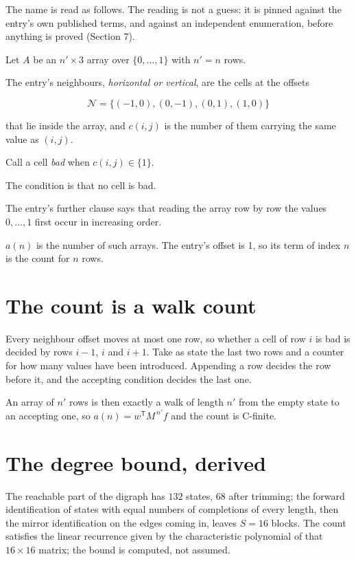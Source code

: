 \documentclass[11pt]{article}
\theoremstyle{definition}
\begin{document}
The name is read as follows. The reading is not a guess: it is pinned against the entry's own published terms, and against an independent enumeration, before anything is proved (Section 7).

Let $A$ be an $n' \times 3$ array over $\{0,\dots,1\}$ with $n' = n$ rows.

The entry's neighbours, {\itshape horizontal or vertical}, are the cells at the offsets

\[\mathcal{N} = \{(-1,0), (0,-1), (0,1), (1,0)\}\]

that lie inside the array, and $c(i,j)$ is the number of them carrying the same value as $(i,j)$.

Call a cell {\itshape bad} when $c(i,j) \in \{1\}$.

The condition is that no cell is bad.

The entry's further clause says that reading the array row by row the values $0,\dots,1$ first occur in increasing order.

$a(n)$ is the number of such arrays. The entry's offset is 1, so its term of index $n$ is the count for $n$ rows.

\section{The count is a walk count}

Every neighbour offset moves at most one row, so whether a cell of row $i$ is bad is decided by rows $i-1$, $i$ and $i+1$. Take as state the last two rows and a counter for how many values have been introduced. Appending a row decides the row before it, and the accepting condition decides the last one.

An array of $n'$ rows is then exactly a walk of length $n'$ from the empty state to an accepting one, so $a(n) = w^{\mathsf T}M^{\,n'}f$ and the count is C-finite.

\section{The degree bound, derived}

The reachable part of the digraph has $132$ states, $68$ after trimming; the forward identification of states with equal numbers of completions of every length, then the mirror identification on the edges coming in, leaves $S = 16$ blocks. The count satisfies the linear recurrence given by the characteristic polynomial of that $16\times16$ matrix; the bound is computed, not assumed.
\end{document}
